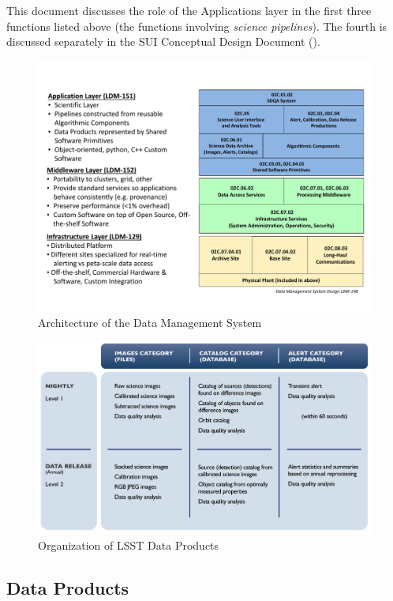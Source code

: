This document discusses the role of the Applications layer in the first three functions listed above (the functions involving \emph{science pipelines}).  The fourth is discussed separately in the SUI Conceptual Design Document (\SUI).

\begin{figure}
\centering
\includegraphics[angle=90,scale=0.70]{figures/DMS-Architecture.pdf}
\caption{Architecture of the Data Management System\label{fig:DMS}}
\end{figure}

\begin{figure}
\centering
\includegraphics[angle=90]{figures/DataProductDelivarables.png}
\caption{Organization of LSST Data Products\label{fig:DP}}
\end{figure}

\subsection{Data Products}

